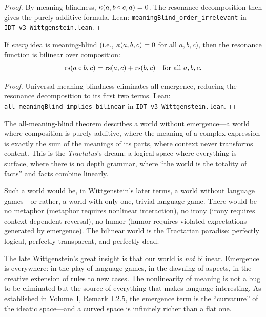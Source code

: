 \begin{proof}
By meaning-blindness, $\kappa(a, b \circ c, d) = 0$. The resonance
decomposition then gives the purely additive formula.
Lean: \texttt{meaningBlind\_order\_irrelevant} in
\texttt{IDT\_v3\_Wittgenstein.lean}.
\end{proof}

\begin{theorem}
\label{thm:all-meaning-blind-bilinear}
If \emph{every} idea is meaning-blind (i.e., $\kappa(a, b, c) = 0$ for all
$a, b, c$), then the resonance function is bilinear over composition:
\[
\mathrm{rs}(a \circ b, c) = \mathrm{rs}(a, c) + \mathrm{rs}(b, c) \quad \text{for all } a, b, c.
\]
\end{theorem}

\begin{proof}
Universal meaning-blindness eliminates all emergence, reducing the resonance
decomposition to its first two terms.
Lean: \texttt{all\_meaningBlind\_implies\_bilinear} in
\texttt{IDT\_v3\_Wittgenstein.lean}.
\end{proof}

\begin{interpretation}
The all-meaning-blind theorem describes a world without emergence---a world
where composition is purely additive, where the meaning of a complex expression
is exactly the sum of the meanings of its parts, where context never transforms
content. This is the \textit{Tractatus}'s dream: a logical space where
everything is surface, where there is no depth grammar, where ``the world is
the totality of facts'' and facts combine linearly.

Such a world would be, in Wittgenstein's later terms, a world without language
games---or rather, a world with only one, trivial language game. There would be
no metaphor (metaphor requires nonlinear interaction), no irony (irony requires
context-dependent reversal), no humor (humor requires violated expectations
generated by emergence). The bilinear world is the Tractarian paradise: perfectly
logical, perfectly transparent, and perfectly dead.

The late Wittgenstein's great insight is that our world is \emph{not} bilinear.
Emergence is everywhere: in the play of language games, in the dawning of aspects,
in the creative extension of rules to new cases. The nonlinearity of meaning is
not a bug to be eliminated but the source of everything that makes language
interesting. As established in Volume~I, Remark~I.2.5, the emergence term is
the ``curvature'' of the ideatic space---and a curved space is infinitely
richer than a flat one.
\end{interpretation}

